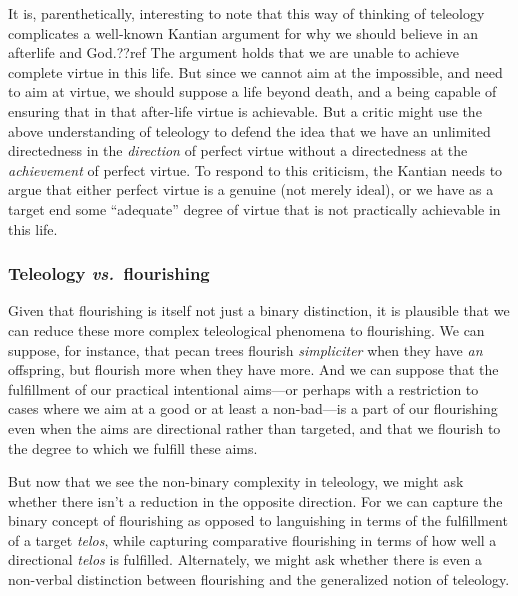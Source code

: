 It is, parenthetically, interesting to note that this way of thinking of teleology complicates a well-known 
Kantian argument for why we should believe in 
an afterlife and God.??ref The argument holds that we are unable to achieve complete virtue in this life. But since we cannot aim at
the impossible, and need to aim at virtue, we should suppose a life beyond death, and a being capable of ensuring that in that after-life virtue
is achievable. But a critic might use the above understanding of teleology to defend the idea that we have an unlimited 
directedness in the \textit{direction} of perfect virtue without a directedness at the \textit{achievement} of perfect virtue. To respond to this criticism, the Kantian needs to  argue that either perfect virtue is a genuine (not merely ideal), or we have as a target end some ``adequate'' degree of virtue that is not
practically achievable in this life.

\subsubsection{Teleology \textit{vs.}\ flourishing}
Given that flourishing is itself not just a binary distinction, it is plausible that we can reduce these more
complex teleological phenomena to flourishing. We can suppose, for instance, that pecan trees flourish 
\textit{simpliciter} when they have \textit{an} offspring, but flourish more when they have more. And we can
suppose that the fulfillment of our practical intentional aims---or perhaps with a restriction to
cases where we aim at a good or at least a non-bad---is a part of our flourishing even when the aims are
directional rather than targeted, and that we flourish to the degree to which we fulfill these aims. 

But now that we see the non-binary complexity in teleology, we might ask whether there isn't a reduction
in the opposite direction. For we can capture the binary concept of flourishing as opposed to languishing
in terms of the fulfillment of a target \textit{telos}, while capturing comparative flourishing in terms
of how well a directional \textit{telos} is fulfilled. Alternately, we might ask whether there is even 
a non-verbal distinction between flourishing and the generalized notion of teleology. 

